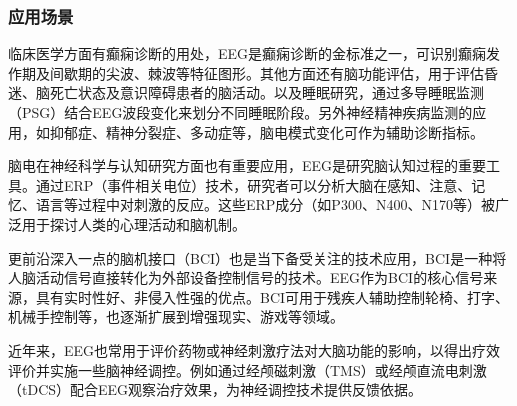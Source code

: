 \documentclass{ctexart}
\begin{document}
			\subsubsection{应用场景}
				临床医学方面有癫痫诊断的用处，EEG是癫痫诊断的金标准之一，可识别癫痫发作期及间歇期的尖波、棘波等特征图形。\cite{癫痫脑电的分类识别及自动检测方法研究}其他方面还有脑功能评估，用于评估昏迷、脑死亡状态及意识障碍患者的脑活动。以及睡眠研究，通过多导睡眠监测（PSG）结合EEG波段变化来划分不同睡眠阶段。另外神经精神疾病监测的应用，如抑郁症、精神分裂症、多动症等，脑电模式变化可作为辅助诊断指标。\par
				脑电在神经科学与认知研究方面也有重要应用，EEG是研究脑认知过程的重要工具。通过ERP（事件相关电位）技术，研究者可以分析大脑在感知、注意、记忆、语言等过程中对刺激的反应。这些ERP成分（如P300、N400、N170等）被广泛用于探讨人类的心理活动和脑机制。\par
				更前沿深入一点的脑机接口（BCI）也是当下备受关注的技术应用，BCI是一种将人脑活动信号直接转化为外部设备控制信号的技术。EEG作为BCI的核心信号来源，具有实时性好、非侵入性强的优点。\cite{无线高通量脑电信号采集关键技术及其在脑机接口中的应用研究}BCI可用于残疾人辅助控制轮椅、打字、机械手控制等，也逐渐扩展到增强现实、游戏等领域。\par
				近年来，EEG也常用于评价药物或神经刺激疗法对大脑功能的影响，以得出疗效评价并实施一些脑神经调控。例如通过经颅磁刺激（TMS）或经颅直流电刺激（tDCS）配合EEG观察治疗效果，为神经调控技术提供反馈依据\cite{一种改进的高维脑电伪影去除方法}。
\end{document}
